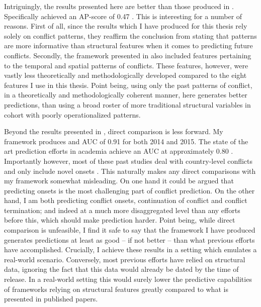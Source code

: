 \documentclass[a4paper]{article}
\begin{document}
Intriguingly, the results presented here are better than those produced in \cite{Maase}. Specifically \cite{Maase} achieved an AP-score of 0.47 \cite[14]{Maase}. This is interesting for a number of reasons. First of all, since the results which I have produced for this thesis rely solely on conflict patterns, they reaffirm the conclusion from \cite{Maase} stating that patterns are more informative than structural features when it comes to predicting future conflicts. Secondly, the framework presented in \cite{Maase} also included features pertaining to the temporal and spatial patterns of conflicts. These features, however, were vastly less theoretically and methodologically developed compared to the eight features I use in this thesis. Point being, using only the past patterns of conflict, in a theoretically and methodologically coherent manner, here generates better predictions, than using a broad roster of more traditional structural variables in cohort with poorly operationalized patterns.\par


Beyond the results presented in \cite{Maase}, direct comparison is less forward. My framework produces and AUC of 0.91 for both 2014 and 2015. The state of the art prediction efforts in academia achieve an AUC at approximately 0.80 \citep[14]{chadefaux2017conflict}. Importantly however, most of these past studies deal with country-level conflicts and only include novel onsets \citep[14]{chadefaux2017conflict}. This naturally makes any direct comparisons with my framework somewhat misleading. On one hand it could be argued that predicting onsets is the most challenging part of conflict prediction. On the other hand, I am both predicting conflict onsets, continuation of conflict and conflict termination; and indeed at a much more disaggregated level than any efforts before this, which should make prediction harder. Point being, while direct comparison is unfeasible, I find it safe to say that the framework I have produced generates predictions at least as good -- if not better -- than what previous efforts have accomplished. Crucially, I achieve these results in a setting which emulates a real-world scenario. Conversely, most previous efforts have relied on structural data, ignoring the fact that this data would already be dated by the time of release. In a real-world setting this would surely lower the predictive capabilities of frameworks relying on structural features greatly compared to what is presented in published papers.\par
\end{document}
